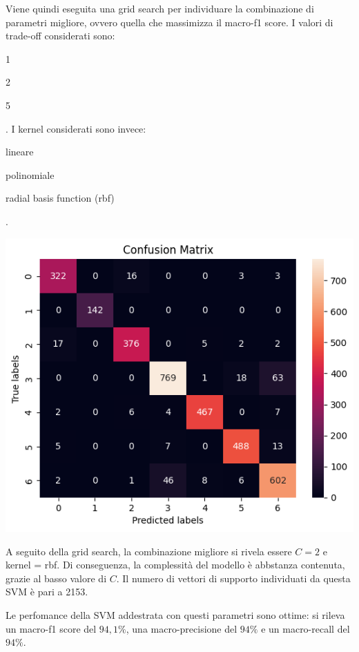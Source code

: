 Viene quindi eseguita una grid search per individuare la combinazione di parametri
migliore, ovvero quella che massimizza il macro-f1 score.
I valori di trade-off considerati sono: \begin{itemize*}
    \item 1
    \item 2
    \item 5
\end{itemize*}.
I kernel considerati sono invece: \begin{itemize*}
    \item lineare
    \item polinomiale
    \item radial basis function (rbf)
\end{itemize*}.

\begin{Figure}
    \centering
    \includegraphics[width=\linewidth]{img/svm_confusion_matrix.png}
\end{Figure}

A seguito della grid search, la combinazione migliore si rivela essere $C=2$ e
kernel = rbf. Di conseguenza, la complessità del modello è abbstanza contenuta,
grazie al basso valore di $C$.
Il numero di vettori di supporto individuati da questa SVM è pari a 2153.

Le perfomance della SVM addestrata con questi parametri sono ottime:
si rileva un macro-f1 score del $94,1\%$, 
una macro-precisione del $94\%$ e un macro-recall del $94\%$.

